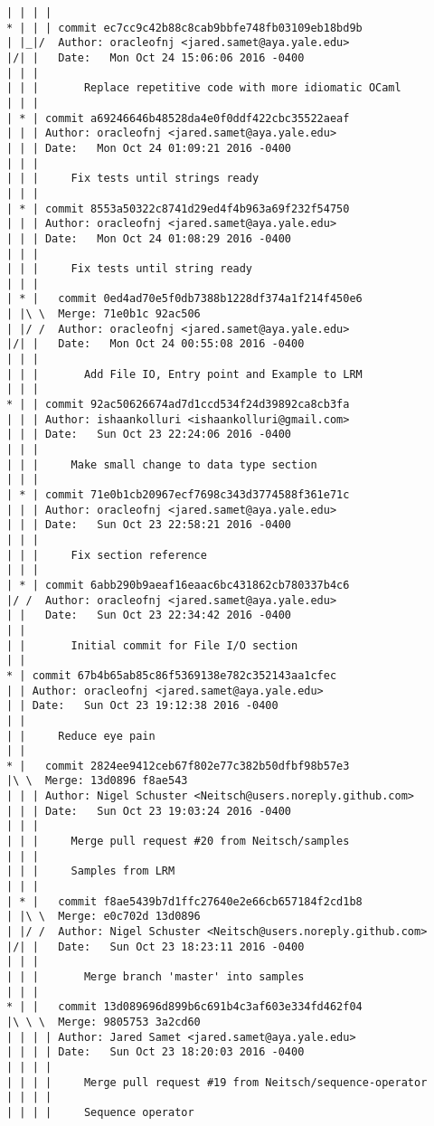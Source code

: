 \begin{lstlisting}
| | | |     
* | | | commit ec7cc9c42b88c8cab9bbfe748fb03109eb18bd9b
| |_|/  Author: oracleofnj <jared.samet@aya.yale.edu>
|/| |   Date:   Mon Oct 24 15:06:06 2016 -0400
| | |   
| | |       Replace repetitive code with more idiomatic OCaml
| | |    
| * | commit a69246646b48528da4e0f0ddf422cbc35522aeaf
| | | Author: oracleofnj <jared.samet@aya.yale.edu>
| | | Date:   Mon Oct 24 01:09:21 2016 -0400
| | | 
| | |     Fix tests until strings ready
| | |    
| * | commit 8553a50322c8741d29ed4f4b963a69f232f54750
| | | Author: oracleofnj <jared.samet@aya.yale.edu>
| | | Date:   Mon Oct 24 01:08:29 2016 -0400
| | | 
| | |     Fix tests until string ready
| | |      
| * |   commit 0ed4ad70e5f0db7388b1228df374a1f214f450e6
| |\ \  Merge: 71e0b1c 92ac506
| |/ /  Author: oracleofnj <jared.samet@aya.yale.edu>
|/| |   Date:   Mon Oct 24 00:55:08 2016 -0400
| | |   
| | |       Add File IO, Entry point and Example to LRM
| | |    
* | | commit 92ac50626674ad7d1ccd534f24d39892ca8cb3fa
| | | Author: ishaankolluri <ishaankolluri@gmail.com>
| | | Date:   Sun Oct 23 22:24:06 2016 -0400
| | | 
| | |     Make small change to data type section
| | |    
| * | commit 71e0b1cb20967ecf7698c343d3774588f361e71c
| | | Author: oracleofnj <jared.samet@aya.yale.edu>
| | | Date:   Sun Oct 23 22:58:21 2016 -0400
| | | 
| | |     Fix section reference
| | |    
| * | commit 6abb290b9aeaf16eaac6bc431862cb780337b4c6
|/ /  Author: oracleofnj <jared.samet@aya.yale.edu>
| |   Date:   Sun Oct 23 22:34:42 2016 -0400
| |   
| |       Initial commit for File I/O section
| |   
* | commit 67b4b65ab85c86f5369138e782c352143aa1cfec
| | Author: oracleofnj <jared.samet@aya.yale.edu>
| | Date:   Sun Oct 23 19:12:38 2016 -0400
| | 
| |     Reduce eye pain
| |     
* |   commit 2824ee9412ceb67f802e77c382b50dfbf98b57e3
|\ \  Merge: 13d0896 f8ae543
| | | Author: Nigel Schuster <Neitsch@users.noreply.github.com>
| | | Date:   Sun Oct 23 19:03:24 2016 -0400
| | | 
| | |     Merge pull request #20 from Neitsch/samples
| | |     
| | |     Samples from LRM
| | |      
| * |   commit f8ae5439b7d1ffc27640e2e66cb657184f2cd1b8
| |\ \  Merge: e0c702d 13d0896
| |/ /  Author: Nigel Schuster <Neitsch@users.noreply.github.com>
|/| |   Date:   Sun Oct 23 18:23:11 2016 -0400
| | |   
| | |       Merge branch 'master' into samples
| | |      
* | |   commit 13d089696d899b6c691b4c3af603e334fd462f04
|\ \ \  Merge: 9805753 3a2cd60
| | | | Author: Jared Samet <jared.samet@aya.yale.edu>
| | | | Date:   Sun Oct 23 18:20:03 2016 -0400
| | | | 
| | | |     Merge pull request #19 from Neitsch/sequence-operator
| | | |     
| | | |     Sequence operator

\end{lstlisting}
